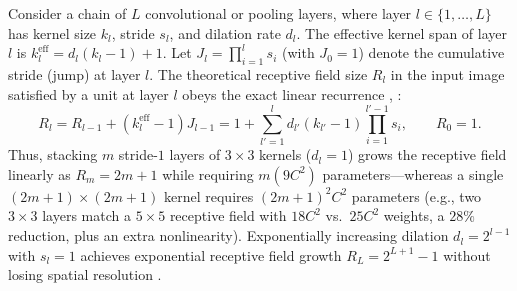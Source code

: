 \documentclass[../../../../master.tex]{subfiles}
\begin{document}
\begin{coremath}
\label{box:cnn:rf_separable}
Consider a chain of $L$ convolutional or pooling layers, where layer $l \in \{1, \dots, L\}$ has kernel size $k_l$, stride $s_l$, and dilation rate $d_l$. The effective kernel span of layer $l$ is $k_l^{\mathrm{eff}} = d_l(k_l - 1) + 1$. Let $J_l = \prod_{i=1}^{l} s_i$ (with $J_0 = 1$) denote the cumulative stride (jump) at layer $l$. The theoretical receptive field size $R_l$ in the input image satisfied by a unit at layer $l$ obeys the exact linear recurrence , :
\begin{equation}
\label{eq:cnn:rf_recursion}
R_l = R_{l-1} + (k_l^{\mathrm{eff}} - 1) J_{l-1} = 1 + \sum_{l'=1}^{l} d_{l'}(k_{l'} - 1) \prod_{i=1}^{l'-1} s_i, \qquad R_0 = 1.
\end{equation}
Thus, stacking $m$ stride-$1$ layers of $3 \times 3$ kernels ($d_l = 1$) grows the receptive field linearly as $R_m = 2m + 1$ while requiring $m(9 C^2)$ parameters---whereas a single $(2m+1)\times(2m+1)$ kernel requires $(2m+1)^2 C^2$ parameters (e.g., two $3\times 3$ layers match a $5\times 5$ receptive field with $18 C^2$ vs.\ $25 C^2$ weights, a $28\%$ reduction, plus an extra nonlinearity). Exponentially increasing dilation $d_l = 2^{l-1}$ with $s_l = 1$ achieves exponential receptive field growth $R_L = 2^{L+1} - 1$ without losing spatial resolution .


\end{coremath}
\end{document}
